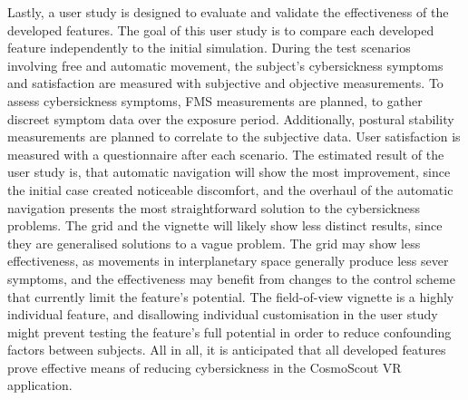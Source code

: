 Lastly, a user study is designed to evaluate and validate the effectiveness of the developed features.
The goal of this user study is to compare each developed feature independently to the initial simulation.
During the test scenarios involving free and automatic movement, the subject's cybersickness symptoms and satisfaction
are measured with subjective and objective measurements.
To assess cybersickness symptoms, FMS measurements are planned, to gather discreet symptom data over the exposure
period.
Additionally, postural stability measurements are planned to correlate to the subjective data.
User satisfaction is measured with a questionnaire after each scenario.
The estimated result of the user study is, that automatic navigation will show the most improvement, since the
initial case created noticeable discomfort, and the overhaul of the automatic navigation presents the most
straightforward solution to the cybersickness problems.
The grid and the vignette will likely show less distinct results, since they are generalised solutions to a vague
problem.
The grid may show less effectiveness, as movements in interplanetary space generally produce less sever symptoms, and
the effectiveness may benefit from changes to the control scheme that currently limit the feature's potential.
The field-of-view vignette is a highly individual feature, and disallowing individual customisation in the user study
might prevent testing the feature's full potential in order to reduce confounding factors between subjects.
All in all, it is anticipated that all developed features prove effective means of reducing cybersickness in the
CosmoScout VR application.
